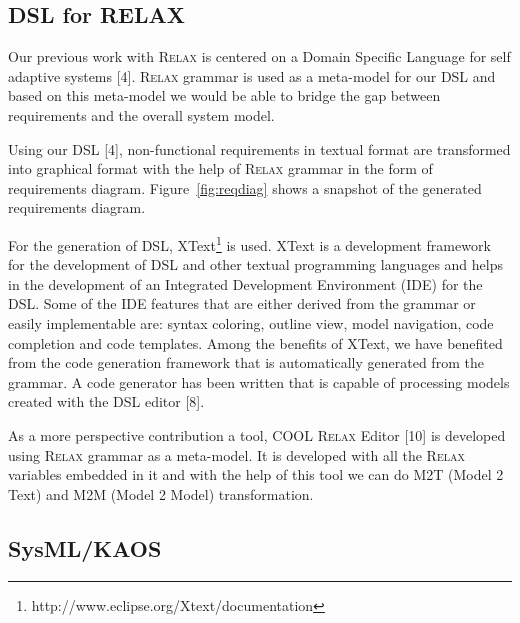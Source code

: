 \documentclass[10pt, conference, compsocconf]{IEEEtran}
\def\myrelax{\textsc{Relax}}                  %
\def\kaos{\textsc{Kaos}}
\newcommand{\Myfig}[1]{Figure~\ref{fig:#1}}
\begin{document}
\subsection{DSL for RELAX}

Our previous work with \myrelax{} is centered on a Domain Specific Language for self adaptive systems [4]. \myrelax{} grammar is used as a meta-model for our DSL and based on this meta-model we would be able to bridge the gap between requirements and the overall system model. 

Using our DSL [4], non-functional requirements in textual format are transformed into graphical format with the help of \myrelax{} grammar in the form of requirements diagram. \Myfig{reqdiag} shows a snapshot of the generated requirements diagram.  



For the generation of DSL, XText\footnote{http://www.eclipse.org/Xtext/documentation} is used. XText is a development framework for the development of DSL and other textual programming languages and helps in the development of an  Integrated Development Environment (IDE) for the DSL. Some of the IDE features that are either derived from the grammar or easily implementable are: syntax coloring, outline view, model navigation, code completion and code templates. Among the benefits of XText, we have benefited from the code generation framework that is automatically generated from the grammar. A code generator has been written that is capable of processing models created with the DSL editor [8]. 


As a more perspective contribution a tool, COOL \myrelax{} Editor [10] is developed using \myrelax{} grammar as a meta-model. It is developed with all the \myrelax{} variables embedded in it and with the help of this tool we can do M2T (Model 2 Text) and M2M (Model 2 Model) transformation. 

\subsection{SysML/KAOS}

\end{document}
